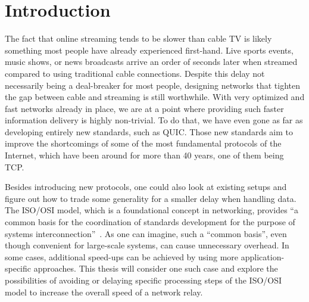 
\chapter{Introduction}\label{chap:introduction}


The fact that online streaming tends to be slower than cable TV is likely something most people have already 
experienced first-hand.
Live sports events, music shows, or news broadcasts arrive an order of seconds later when streamed compared
to using traditional cable connections. %
Despite this delay not necessarily being a deal-breaker for most people, designing networks that 
tighten the gap between cable and streaming is still worthwhile.
With very optimized and fast networks already in place, we are at a point where providing such faster information
delivery is highly non-trivial.
To do that, we have even gone as far as developing entirely new standards, such as QUIC\@. 
Those new standards aim to improve the shortcomings of some of the most fundamental protocols of the Internet, which have been around for more than 40 years, one of them being TCP. 


Besides introducing new protocols, one could also look at existing setups and figure out how to trade some generality
for a smaller delay when handling data.
The ISO/OSI model, which is a foundational concept in networking, provides ``a common basis for the coordination 
of standards development for the purpose of systems interconnection''~\parencite{iso-osi-standard}.
As one can imagine, such a ``common basis'', even though convenient for large-scale systems, can cause unnecessary
overhead.
In some cases, additional speed-ups can be achieved by using more application-specific approaches.
This thesis will consider one such case and explore the possibilities of avoiding or delaying specific processing
steps of the ISO/OSI model to increase the overall speed of a network relay.







